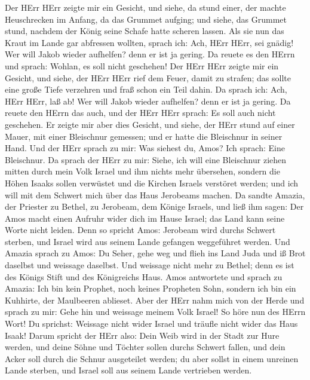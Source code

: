  Der HErr HErr zeigte mir ein Gesicht, und siehe, da stund
einer, der machte Heuschrecken im Anfang, da das Grummet aufging; und
siehe, das Grummet stund, nachdem der König seine Schafe hatte scheren
lassen.  Als sie nun das Kraut im Lande gar abfressen
wollten, sprach ich: Ach, HErr HErr, sei gnädig! Wer will Jakob wieder
aufhelfen? denn er ist ja gering.  Da reuete es den HErrn
und sprach: Wohlan, es soll nicht geschehen!  Der HErr HErr
zeigte mir ein Gesicht, und siehe, der HErr HErr rief dem Feuer, damit
zu strafen; das sollte eine große Tiefe verzehren und fraß schon ein
Teil dahin.  Da sprach ich: Ach, HErr HErr, laß ab! Wer will
Jakob wieder aufhelfen? denn er ist ja gering.  Da reuete
den HErrn das auch, und der HErr HErr sprach: Es soll auch nicht
geschehen.  Er zeigte mir aber dies Gesicht, und siehe, der
HErr stund auf einer Mauer, mit einer Bleischnur gemessen; und er hatte
die Bleischnur in seiner Hand.  Und der HErr sprach zu mir:
Was siehest du, Amos? Ich sprach: Eine Bleischnur. Da sprach der HErr zu
mir: Siehe, ich will eine Bleischnur ziehen mitten durch mein Volk
Israel und ihm nichts mehr übersehen,  sondern die Höhen
Isaaks sollen verwüstet und die Kirchen Israels verstöret werden; und
ich will mit dem Schwert mich über das Haus Jerobeams machen.
 Da sandte Amazia, der Priester zu Bethel, zu Jerobeam, dem
Könige Israels, und ließ ihm sagen: Der Amos macht einen Aufruhr wider
dich im Hause Israel; das Land kann seine Worte nicht leiden.
 Denn so spricht Amos: Jerobeam wird durchs Schwert
sterben, und Israel wird aus seinem Lande gefangen weggeführet werden.
 Und Amazia sprach zu Amos: Du Seher, gehe weg und flieh
ins Land Juda und iß Brot daselbst und weissage daselbst. 
Und weissage nicht mehr zu Bethel; denn es ist des Königs Stift und des
Königreichs Haus.  Amos antwortete und sprach zu Amazia:
Ich bin kein Prophet, noch keines Propheten Sohn, sondern ich bin ein
Kuhhirte, der Maulbeeren ablieset.  Aber der HErr nahm mich
von der Herde und sprach zu mir: Gehe hin und weissage meinem Volk
Israel!  So höre nun des HErrn Wort! Du sprichst: Weissage
nicht wider Israel und träufle nicht wider das Haus Isaak! 
Darum spricht der HErr also: Dein Weib wird in der Stadt zur Hure
werden, und deine Söhne und Töchter sollen durchs Schwert fallen, und
dein Acker soll durch die Schnur ausgeteilet werden; du aber sollst in
einem unreinen Lande sterben, und Israel soll aus seinem Lande
vertrieben werden.

